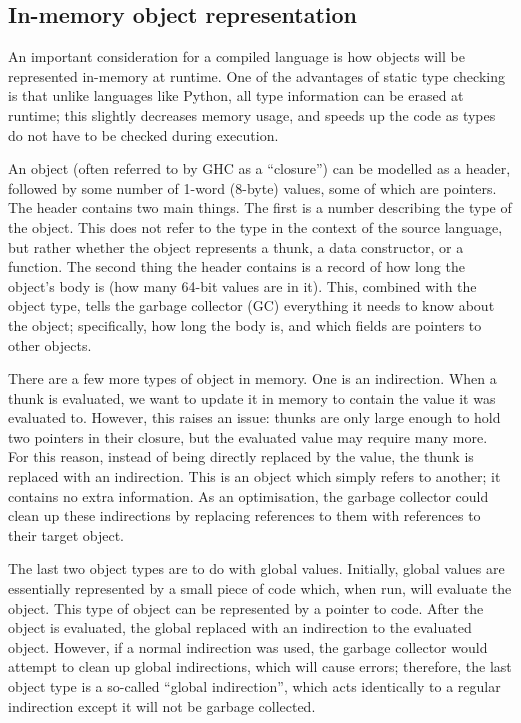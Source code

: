 \documentclass[9pt]{extarticle}
\begin{document}
\subsection{In-memory object representation}

An important consideration for a compiled language is how objects will
be represented in-memory at runtime. One of the advantages of static
type checking is that unlike languages like Python, all type information
can be erased at runtime; this slightly decreases memory usage, and
speeds up the code as types do not have to be checked during execution.

An object (often referred to by GHC as a ``closure'') can be modelled as
a header, followed by some number of 1-word (8-byte) values, some of
which are pointers. The header contains two main things. The first is a
number describing the type of the object. This does not refer to the
type in the context of the source language, but rather whether the
object represents a thunk, a data constructor, or a function. The second
thing the header contains is a record of how long the object's body is
(how many 64-bit values are in it). This, combined with the object type,
tells the garbage collector (GC) everything it needs to know about the
object; specifically, how long the body is, and which fields are
pointers to other objects.

There are a few more types of object in memory. One is an indirection.
When a thunk is evaluated, we want to update it in memory to contain the
value it was evaluated to. However, this raises an issue: thunks are
only large enough to hold two pointers in their closure, but the
evaluated value may require many more. For this reason, instead of being
directly replaced by the value, the thunk is replaced with an
indirection. This is an object which simply refers to another; it
contains no extra information.  As an optimisation, the garbage
collector could clean up these indirections by replacing references to
them with references to their target object.

The last two object types are to do with global values. Initially,
global values are essentially represented by a small piece of code
which, when run, will evaluate the object. This type of object can be
represented by a pointer to code. After the object is evaluated, the
global replaced with an indirection to the evaluated object. However, if
a normal indirection was used, the garbage collector would attempt to
clean up global indirections, which will cause errors; therefore, the
last object type is a so-called ``global indirection'', which acts
identically to a regular indirection except it will not be garbage
collected.
\end{document}
